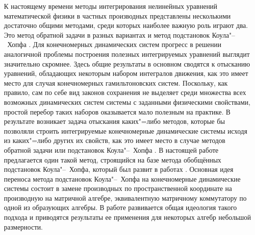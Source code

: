 


\date{20/XII/2010}


\maketitle


 К настоящему времени методы интегрирования
нелинейных уравнений математической физики в частных производных
представлены несколькими достаточно общими методами, среди которых
наиболее важную роль играют два. Это метод обратной задачи в
разных вариантах \cite{zhu:ZaNP,zhu:DU} и метод подстановок
Коула"--~Хопфа  \cite{zhu:ZhTMF09}. Для конечномерных
динамических систем прогресс в решении аналогичной проблемы
построения полезных интегрируемых уравнений выглядит значительно
скромнее. Здесь общие результаты в основном сводятся к отысканию
уравнений, обладающих некоторым набором интегралов движения, как
это имеет место для случая конечномерных гамильтоновских систем.
    Поскольку, как правило, сам по себе вид законов сохранения не выделяет
    среди множества всех возможных динамических систем системы с
    заданными физическими свойствами,  простой перебор таких
    наборов оказывается мало полезным на практике. В результате
    возникает задача отыскания каких"=либо методов, которые бы
    позволяли строить интегрируемые конечномерные динамические
    системы исходя из каких"=либо других их свойств, как это имеет
    место в случае методов обратной задачи или подстановок
Коула"--~Хопфа \cite{zhu:ZhTMF09}.
    В настоящей работе предлагается один такой метод, строящийся
 на базе метода обобщённых  подстановок Коула"--~Хопфа,
    который был развит в работах \cite{zhu:ZhTMF09,zhu:ZhZh08}. Основная
    идея переноса метода подстановок
Коула"--~Хопфа на конечномерные динамические системы
    состоит в замене производных по пространственной координате на
    производную на матричной алгебре, эквивалентную матричному коммутатору по одной
    из образующих алгебры. В работе развивается общая идеология
    такого подхода и приводятся результаты ее применения для
    некоторых алгебр небольшой размерности.



